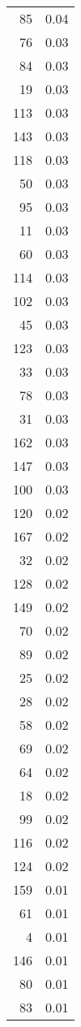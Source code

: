 \begin{longtable}{rr}
   85 & 0.04 \\ 
   76 & 0.03 \\ 
   84 & 0.03 \\ 
   19 & 0.03 \\ 
  113 & 0.03 \\ 
  143 & 0.03 \\ 
  118 & 0.03 \\ 
   50 & 0.03 \\ 
   95 & 0.03 \\ 
   11 & 0.03 \\ 
   60 & 0.03 \\ 
  114 & 0.03 \\ 
  102 & 0.03 \\ 
   45 & 0.03 \\ 
  123 & 0.03 \\ 
   33 & 0.03 \\ 
   78 & 0.03 \\ 
   31 & 0.03 \\ 
  162 & 0.03 \\ 
  147 & 0.03 \\ 
  100 & 0.03 \\ 
  120 & 0.02 \\ 
  167 & 0.02 \\ 
   32 & 0.02 \\ 
  128 & 0.02 \\ 
  149 & 0.02 \\ 
   70 & 0.02 \\ 
   89 & 0.02 \\ 
   25 & 0.02 \\ 
   28 & 0.02 \\ 
   58 & 0.02 \\ 
   69 & 0.02 \\ 
   64 & 0.02 \\ 
   18 & 0.02 \\ 
   99 & 0.02 \\ 
  116 & 0.02 \\ 
  124 & 0.02 \\ 
  159 & 0.01 \\ 
   61 & 0.01 \\ 
    4 & 0.01 \\ 
  146 & 0.01 \\ 
   80 & 0.01 \\ 
   83 & 0.01 \\ 
   \hline
\hline
\end{longtable}
